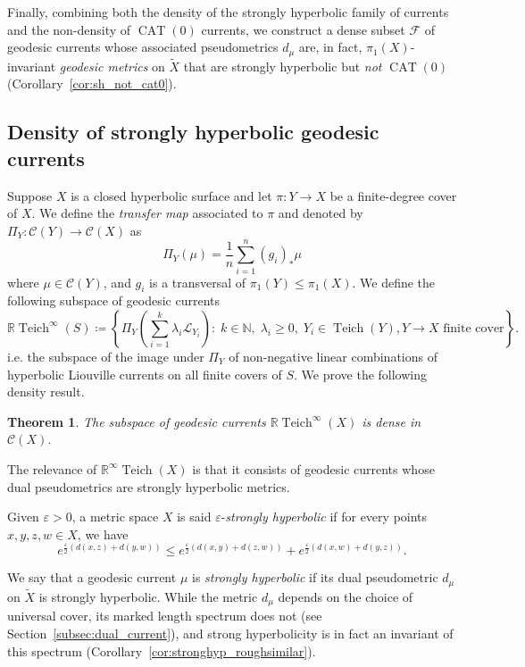 \documentclass[12pt]{amsart}
\numberwithin{equation}{section}
\numberwithin{figure}{section}
\newtheorem{mainthm}{Theorem}
\theoremstyle{definition}
\theoremstyle{plain}
\newcommand\C{\mathcal{C}}
\DeclareMathOperator{\Teich}{Teich}
\DeclareMathOperator{\CAT}{CAT}
\renewcommand{\epsilon}{\varepsilon}
\begin{document}
Finally, combining both the density of the strongly hyperbolic family of currents and the non-density of $\CAT(0)$ currents, we construct a dense subset $\mathcal{F}$ of geodesic currents whose associated pseudometrics $d_\mu$ are, in fact, $\pi_1(X)$-invariant \emph{geodesic metrics} on $\widetilde{X}$ that are strongly hyperbolic but \emph{not} $\CAT(0)$ (Corollary~\ref{cor:sh_not_cat0}).
 
\subsection{Density of strongly hyperbolic geodesic currents}

Suppose $X$ is a closed hyperbolic surface and
let $\pi \colon Y \to X$ be a finite-degree cover of $X$. We define the \emph{transfer map} associated to $\pi$ and denoted by $\Pi_Y: \mathcal{C}(Y) \rightarrow \mathcal{C}(X)$ as 
\[
\Pi_Y(\mu) = \frac{1}{n} \sum_{i=1}^n (g_i)_* \mu
\]
where $\mu \in \mathcal{C}(Y)$, and $g_i$ is a transversal of $\pi_1(Y) \leq \pi_1(X)$.
We define the following subspace of geodesic currents
\begin{equation}
\mathbb{R}\Teich^\infty(S)
\coloneqq
\left\{
\Pi_{Y}\!\left(\sum_{i=1}^k \lambda_i \mathcal{L}_{Y_i}\right)
:\;
k \in \mathbb{N},\;
\lambda_i \ge 0,\;
Y_i \in \Teich(Y),
Y \to X
\text{ finite cover}
\right\}.
\label{eq:rteichinfty}
\end{equation}
i.e. the subspace of the image under $\Pi_Y$ of non-negative linear combinations of hyperbolic Liouville currents on all finite covers of $S$. 
We prove the following density result.

\begin{mainthm}
The subspace of geodesic currents $\mathbb{R}\Teich^{\infty}(X)$ is dense in $\C(X)$.
\label{mainthm:rteich_dense}
\end{mainthm}

The relevance of $\mathbb{R}^{\infty}\Teich(X)$ is that it consists of geodesic currents whose dual pseudometrics are strongly hyperbolic metrics.
 
Given $\epsilon>0$, a metric space $X$ is said $\epsilon$-\emph{strongly hyperbolic} if for every points $x,y,z,w \in X$, we have
\begin{equation}
e^{\frac{\epsilon}{2}(d(x,z) + d(y,w))} \leq e^{\frac{\epsilon}{2}(d(x,y) + d(z,w))} + e^{\frac{\epsilon}{2}(d(x,w) + d(y,z))}.
\label{eq:intro_sh}
\end{equation}

We say that a geodesic current $\mu$ is \emph{strongly hyperbolic} if its dual pseudometric $d_\mu$ on $\widetilde{X}$ is strongly hyperbolic. 
While the metric $d_\mu$ depends on the choice of universal cover, its marked length spectrum does not (see Section~\ref{subsec:dual_current}), and strong hyperbolicity is in fact an invariant of this spectrum (Corollary~\ref{cor:stronghyp_roughsimilar}).
\end{document}
